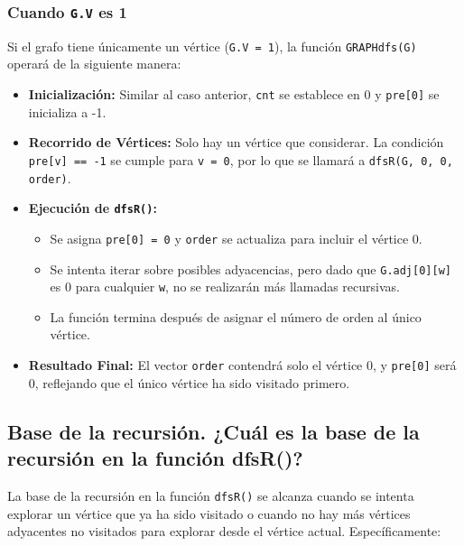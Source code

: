 \documentclass{article}
\begin{document}
        \subsubsection*{Cuando \texttt{G.V} es 1}
            Si el grafo tiene únicamente un vértice (\texttt{G.V = 1}), la función \texttt{GRAPHdfs(G)} operará de la siguiente manera:
            
            \begin{itemize}
                \item \textbf{Inicialización:} Similar al caso anterior, \texttt{cnt} se establece en 0 y \texttt{pre[0]} se inicializa a -1.
                
                \item \textbf{Recorrido de Vértices:} Solo hay un vértice que considerar. La condición \texttt{pre[v] == -1} se cumple para \texttt{v = 0}, por lo que se llamará a \texttt{dfsR(G, 0, 0, order)}.
                
                \item \textbf{Ejecución de \texttt{dfsR()}:} 
                \begin{itemize}
                    \item Se asigna \texttt{pre[0] = 0} y \texttt{order} se actualiza para incluir el vértice 0.
                    \item Se intenta iterar sobre posibles adyacencias, pero dado que \texttt{G.adj[0][w]} es 0 para cualquier \texttt{w}, no se realizarán más llamadas recursivas.
                    \item La función termina después de asignar el número de orden al único vértice.
                \end{itemize}
                
                \item \textbf{Resultado Final:} El vector \texttt{order} contendrá solo el vértice 0, y \texttt{pre[0]} será 0, reflejando que el único vértice ha sido visitado primero.
            \end{itemize}
        
    \subsection{Base de la recursión. ¿Cuál es la base de la recursión en la función dfsR()?}
        La base de la recursión en la función \texttt{dfsR()} se alcanza cuando se intenta explorar un vértice que ya ha sido visitado o cuando no hay más vértices adyacentes no visitados para explorar desde el vértice actual. Específicamente:
    
\end{document}
